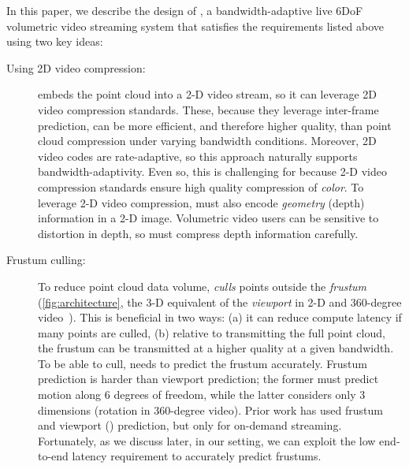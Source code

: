 In this paper, we describe the design of \sysname, a bandwidth-adaptive live 6DoF volumetric video streaming system that satisfies the requirements listed above using two key ideas:
\begin{description}
\item[Using 2D video compression:] \sysname embeds the point cloud into a 2-D video stream, so it can leverage 2D video compression standards.
%
These, because they leverage inter-frame prediction, can be more efficient, and therefore higher quality, than point cloud compression under varying bandwidth conditions.
%
Moreover, 2D video codes are rate-adaptive, so this approach naturally supports bandwidth-adaptivity.
%
Even so, this is challenging for \sysname because 2-D video compression standards ensure high quality compression of \textit{color}.
%
To leverage 2-D video compression, \sysname must also encode \textit{geometry} (\ie depth) information in a 2-D image.
%
Volumetric video users can be sensitive to distortion in depth, so \sysname must compress depth information carefully.


\item[Frustum culling:] To reduce point cloud data volume, \sysname \textit{culls} points outside the \textit{frustum} (\cref{fig:architecture}, the 3-D equivalent of the \textit{viewport} in 2-D and 360-degree video~\cite{dragonfly}).
%
This is beneficial in two ways: (a) it can reduce compute latency if many points are culled, (b) relative to transmitting the full point cloud, the frustum can be transmitted at a higher quality at a given bandwidth.
%
To be able to cull, \sysname needs to predict the frustum accurately.
%
Frustum prediction is harder than viewport prediction; the former must predict motion along 6 degrees of freedom, while the latter considers only 3 dimensions (rotation in 360-degree video).
%
Prior work has used frustum and viewport (\cite{cite:flare, cite:dragonfly}) prediction, but only for on-demand streaming.
%
Fortunately, as we discuss later, in our setting, we can exploit the low end-to-end latency requirement to accurately predict frustums.


\end{description}

